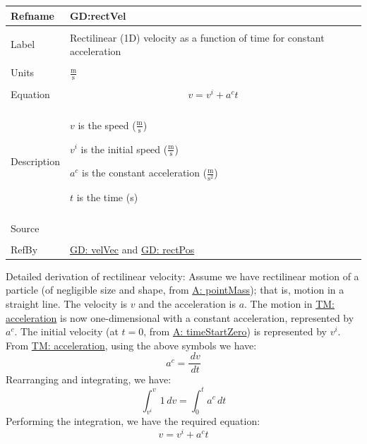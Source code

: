 \documentclass[12pt]{article}
\begin{document}
\noindent \begin{minipage}{\textwidth}
\begin{tabular}{>{\raggedright}p{}>{\raggedright\arraybackslash}p{}}
\toprule \textbf{Refname} & \textbf{GD:rectVel}
\label{GD:rectVel}
\\ \midrule \\
Label & Rectilinear (1D) velocity as a function of time for constant acceleration
\\ \midrule \\
Units & $\frac{\text{m}}{\text{s}}$
\\ \midrule \\
Equation & \begin{displaymath}
           v={v^{i}}+{a^{c}} t
           \end{displaymath}
\\ \midrule \\
Description & \begin{symbDescription}
              \item{$v$ is the speed ($\frac{\text{m}}{\text{s}}$)}
              \item{${v^{i}}$ is the initial speed ($\frac{\text{m}}{\text{s}}$)}
              \item{${a^{c}}$ is the constant acceleration ($\frac{\text{m}}{\text{s}^{2}}$)}
              \item{$t$ is the time (s)}
              \end{symbDescription}
\\ \midrule \\
Source & \cite[(pg. 8)]{hibbeler2004}
\\ \midrule \\
RefBy & \hyperref[GD:velVec]{GD: velVec} and \hyperref[GD:rectPos]{GD: rectPos}
\\ \bottomrule
\end{tabular}
\end{minipage}
Detailed derivation of rectilinear velocity:
Assume we have rectilinear motion of a particle (of negligible size and shape, from \hyperref[pointMass]{A: pointMass}); that is, motion in a straight line. The velocity is $v$ and the acceleration is $a$. The motion in \hyperref[TM:acceleration]{TM: acceleration} is now one-dimensional with a constant acceleration, represented by ${a^{c}}$. The initial velocity (at $t=0$, from \hyperref[timeStartZero]{A: timeStartZero}) is represented by ${v^{i}}$. From \hyperref[TM:acceleration]{TM: acceleration}, using the above symbols we have:
\begin{displaymath}
{a^{c}}=\frac{\,dv}{\,dt}
\end{displaymath}
Rearranging and integrating, we have:
\begin{displaymath}
\int_{{v^{i}}}^{v}{1}\,dv=\int_{0}^{t}{{a^{c}}}\,dt
\end{displaymath}
Performing the integration, we have the required equation:
\begin{displaymath}
v={v^{i}}+{a^{c}} t
\end{displaymath}
\par~
\end{document}
